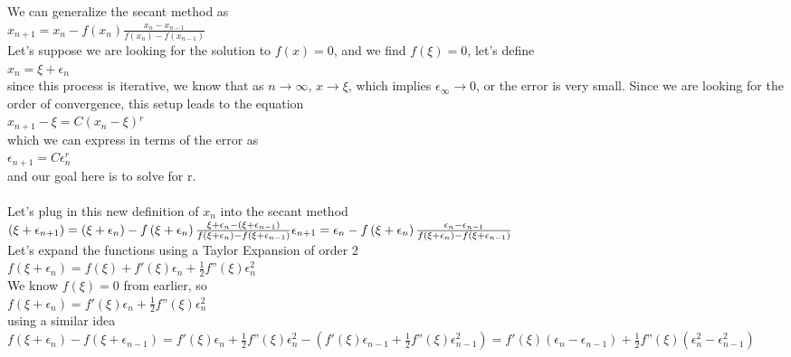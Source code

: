 \documentclass{article}
\begin{document}
We can generalize the secant method as\\
\(x_{n+1}=x_n-f\left(x_n\right) \frac{x_n-x_{n-1}}{f\left(x_n\right)-f\left(x_{n-1}\right)}\)\\
Let{'}s suppose we are looking for the solution to \(f(x)=0\), and we find \(f(\xi )=0\), let{'}s define\\
\(x_n=\xi +\epsilon _n\)\\
since this process is iterative, we know that as \(n\to \infty\), \(x\to \xi\), which implies \(\epsilon _{\infty }\to  0\), or the error is very
small. Since we are looking for the order of convergence, this setup leads to the equation\\
\(x_{n+1}-\xi =C\left(x_n-\xi \right){}^r\)\\
which we can express in terms of the error as\\
\(\epsilon _{n+1}=C \epsilon _n^r\)\\
and our goal here is to solve for r.\\
\\
Let{'}s plug in this new definition of \(x_n\) into the secant method\\
\(\left(\xi +\epsilon _{n+1}\right)=\left(\xi +\epsilon _n\right)-f\left(\xi +\epsilon _n\right) \frac{\xi +\epsilon _n-\left(\xi +\epsilon _{n-1}\right)}{f\left(\xi
+\epsilon _n\right)-f\left(\xi +\epsilon _{n-1}\right)}\\
\\
\epsilon _{n+1}=\epsilon _n-f\left(\xi +\epsilon _n\right) \frac{\epsilon _n-\epsilon _{n-1}}{f\left(\xi +\epsilon _n\right)-f\left(\xi +\epsilon
_{n-1}\right)}\)\\
Let{'}s expand the functions using a Taylor Expansion of order 2\\
\(f\left(\xi +\epsilon _n\right)=f(\xi )+f'(\xi )\epsilon _n+\frac{1}{2}f\text{''}(\xi )\epsilon _n^2\)\\
We know \(f(\xi )=0\) from earlier, so\\
\(f\left(\xi +\epsilon _n\right)=f'(\xi )\epsilon _n+\frac{1}{2}f\text{''}(\xi )\epsilon _n^2\)\\
using a similar idea\\
\(f\left(\xi +\epsilon _n\right)-f\left(\xi +\epsilon _{n-1}\right)=f'(\xi )\epsilon _n+\frac{1}{2}f\text{''}(\xi )\epsilon _n^2-\left(f'(\xi )\epsilon
_{n-1}+\frac{1}{2}f\text{''}(\xi )\epsilon _{n-1}^2\right)=f'(\xi )\left(\epsilon _n-\epsilon _{n-1}\right)+\frac{1}{2}f\text{''}(\xi )\left(\epsilon
_n^2-\epsilon _{n-1}^2\right)\)\\
\end{document}
